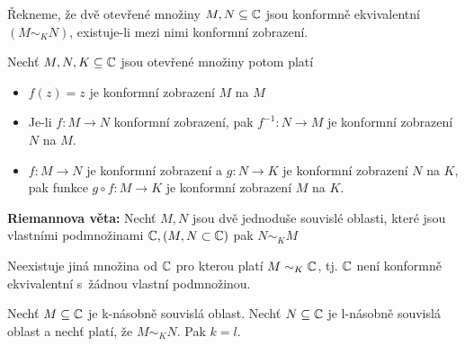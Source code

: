 \begin{definition}
	Řekneme, že dvě otevřené množiny $M,N \subseteq \mathbb{C}$ jsou konformně ekvivalentní $(M\sim_K N)$, existuje-li mezi nimi konformní zobrazení.
\end{definition}

\begin{theorem}
	Nechť $M,N, K \subseteq \mathbb{C}$ jsou otevřené množiny potom platí
	\begin{itemize}
		\item $f(z)=z$ je konformní zobrazení $M$ na $M$
		\item Je-li $f:M\rightarrow N$ konformní zobrazení, pak $f^{-1}: N\rightarrow M$ je konformní zobrazení $N$ na $M$.
		\item $f:M\rightarrow N$ je konformní zobrazení a $g:N\rightarrow K$ je konformní zobrazení $N$ na $K$, pak funkce $g \circ f:M\rightarrow K$ je konformní zobrazení $M$ na $K$.
	\end{itemize}
\end{theorem}

\begin{theorem}
	\textbf{Riemannova věta:} Nechť $M,N$ jsou dvě jednoduše souvislé oblasti, které jsou vlastními podmnožinami $\mathbb{C}, (M,N \subset \mathbb{C}) $ pak $N\sim_K M$
\end{theorem}

\begin{theorem}
	Neexistuje jiná množina od $\mathbb{C}$ pro kterou platí $M\sim_K \mathbb{C}$, tj. $\mathbb{C} $ není konformně ekvivalentní s~žádnou vlastní podmnožinou.
\end{theorem}

\begin{theorem}
	Nechť $M\subseteq \mathbb{C}$ je k-násobně souvislá oblast. Nechť $N \subseteq \mathbb{C} $ je l-násobně souvislá oblast a nechť platí, že $M\sim_K N$. Pak $k=l$.
\end{theorem}




